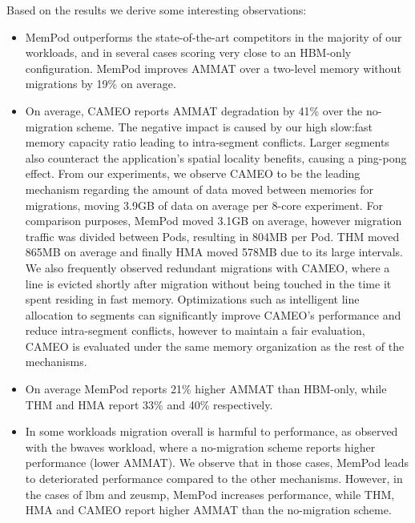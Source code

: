 Based on the results we derive some interesting observations:
\begin{itemize}
\setlength\itemsep{0em}
	\item MemPod outperforms the state-of-the-art competitors in the majority of our workloads, and in several cases scoring very close to an HBM-only configuration. MemPod improves AMMAT over a two-level memory without migrations by 19\% on average.
	\item On average, CAMEO reports AMMAT degradation by 41\% over the no-migration scheme. The negative impact is caused by our high slow:fast memory capacity ratio leading to intra-segment conflicts. Larger segments also counteract the application's spatial locality benefits, causing a ping-pong effect. From our experiments, we observe CAMEO to be the leading mechanism regarding the amount of data moved between memories for migrations, moving 3.9GB of data on average per 8-core experiment. For comparison purposes, MemPod moved 3.1GB on average, however migration traffic was divided between Pods, resulting in 804MB per Pod. THM moved 865MB on average and finally HMA moved 578MB due to its large intervals. We also frequently observed redundant migrations with CAMEO, where a line is evicted shortly after migration without being touched in the time it spent residing in fast memory. Optimizations such as intelligent line allocation to segments can significantly improve CAMEO's performance and reduce intra-segment conflicts, however to maintain a fair evaluation, CAMEO is evaluated under the same memory organization as the rest of the mechanisms.
	\item On average MemPod reports 21\% higher AMMAT than HBM-only, while THM and HMA report 33\% and 40\% respectively.
	
	\item In some workloads migration overall is harmful to performance, 
as observed with the bwaves workload, where a no-migration scheme reports 
higher performance (lower AMMAT). We observe that in those cases, MemPod leads to deteriorated performance compared to the other mechanisms. However, in the cases of lbm and zeusmp, 
MemPod increases performance, while THM, HMA and CAMEO report higher AMMAT than the no-migration scheme.


\end{itemize}
